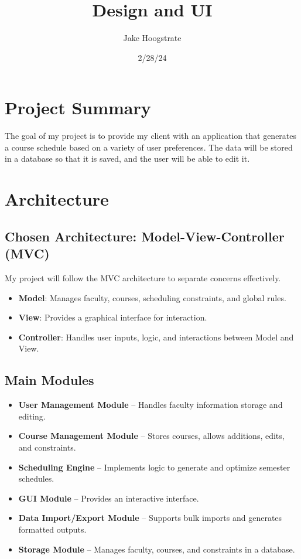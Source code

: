 \documentclass{article}
\title{Design and UI}
\author{Jake Hoogstrate}
\date{2/28/24}
\begin{document}
\maketitle

\section{Project Summary}
The goal of my project is to provide my client with an application that generates a course schedule based on a variety of user preferences. The data will be stored in a database so that it is saved, and the user will be able to edit it.

\section{Architecture}

\subsection{Chosen Architecture: Model-View-Controller (MVC)}
My project will follow the MVC architecture to separate concerns effectively.

\begin{itemize}
    \item \textbf{Model}: Manages faculty, courses, scheduling constraints, and global rules.
    \item \textbf{View}: Provides a graphical interface for interaction.
    \item \textbf{Controller}: Handles user inputs, logic, and interactions between Model and View.
\end{itemize}

\subsection{Main Modules}
\begin{itemize}
    \item \textbf{User Management Module} -- Handles faculty information storage and editing.
    \item \textbf{Course Management Module} -- Stores courses, allows additions, edits, and constraints.
    \item \textbf{Scheduling Engine} -- Implements logic to generate and optimize semester schedules.
    \item \textbf{GUI Module} -- Provides an interactive interface.
    \item \textbf{Data Import/Export Module} -- Supports bulk imports and generates formatted outputs.
    \item \textbf{Storage Module} -- Manages faculty, courses, and constraints in a database.
\end{itemize}
\end{document}
